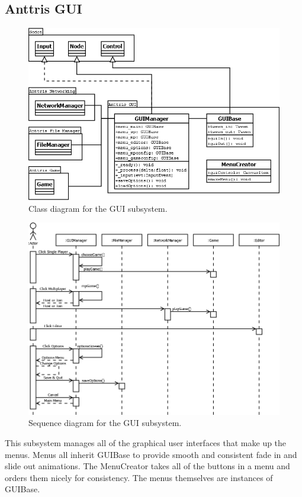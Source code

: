 \documentclass[12pt]{article}
\begin{document}
\subsection{Anttris GUI} %
    \begin{figure}[H]
        \centering
        \includegraphics[width=6in]{Anttris_GUIClass.png}
        \caption{Class diagram for the GUI subsystem.}
    \end{figure}
    \begin{figure}[H]
        \centering
        \includegraphics[width=6in]{Anttris_GUISequence.png}
        \caption{Sequence diagram for the GUI subsystem.}
    \end{figure}

This subsystem manages all of the graphical user interfaces that make up the menus. Menus all inherit GUIBase to provide smooth and consistent fade in and slide out animations. The MenuCreator takes all of the buttons in a menu and orders them nicely for consistency. The menus themselves are instances of GUIBase.
\end{document}
